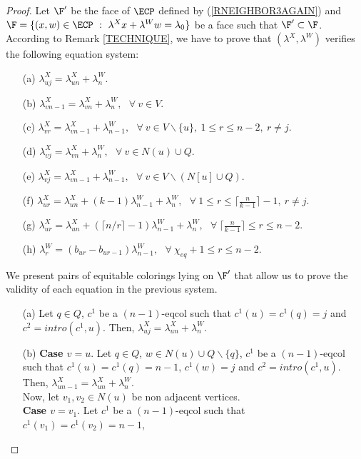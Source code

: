 \begin{proof}
Let $\F'$ be the face of $\ECP$ defined by (\ref{RNEIGHBOR3AGAIN}) and
$\F = \{ (x,w) \in \ECP ~:~ \lambda^X x + \lambda^W w = \lambda_0\}$ be a face such that $\F' \subset \F$.
According to Remark \ref{TECHNIQUE}, we have to prove that $(\lambda^X, \lambda^W)$ verifies the following equation system: 
\begin{enumerate}
\item[(a)] $\lambda^X_{uj} = \lambda^X_{un} + \lambda^W_n$.
\item[(b)] $\lambda^X_{vn-1} = \lambda^X_{vn} + \lambda^W_n,~~~ \forall~ v \in V$.
\item[(c)] $\lambda^X_{vr} = \lambda^X_{vn-1} + \lambda^W_{n-1},~~~ \forall~ v \in V \backslash \{u\},~ 1 \leq r \leq n - 2,~ r \neq j$.
\item[(d)] $\lambda^X_{vj} = \lambda^X_{vn} + \lambda^W_n,~~~ \forall~ v \in N(u) \cup Q$.
\item[(e)] $\lambda^X_{vj} = \lambda^X_{vn-1} + \lambda^W_{n-1},~~~ \forall~ v \in V \backslash (N[u] \cup Q)$.
\item[(f)] $\lambda^X_{ur} = \lambda^X_{un} + (k - 1) \lambda^W_{n-1} + \lambda^W_n,~~~ \forall~ 1 \leq r \leq \lceil \frac{n}{k-1} \rceil - 1,~ r \neq j$.
\item[(g)] $\lambda^X_{ur} = \lambda^X_{un} + (\lceil n / r \rceil - 1) \lambda^W_{n-1} + \lambda^W_n,~~~ \forall~ \lceil \frac{n}{k-1} \rceil \leq r \leq n - 2$.
\item[(h)] $\lambda^W_r = (b_{ur} - b_{ur-1}) \lambda^W_{n-1},~~~ \forall~ \chi_{eq} + 1 \leq r \leq n-2$.
\end{enumerate}
We present pairs of equitable colorings lying on $\F'$ that allow us to
prove the validity of each equation in the previous system.
\begin{enumerate}
\item[(a)] Let $q \in Q$, $c^1$ be a $(n-1)$-eqcol such that $c^1(u) = c^1(q) = j$ and $c^2 = intro(c^1,u)$.
Then, $\lambda^X_{uj} = \lambda^X_{un} + \lambda^W_n$.
\item[(b)] \textbf{Case $v = u$}. Let $q \in Q$, $w \in N(u) \cup Q \backslash \{q\}$, $c^1$ be a $(n-1)$-eqcol
such that $c^1(u) = c^1(q) = n-1$, $c^1(w) = j$ and $c^2 = intro(c^1,u)$. Then, $\lambda^X_{un-1} = \lambda^X_{un} + \lambda^W_n$.\\
Now, let $v_1, v_2 \in N(u)$ be non adjacent vertices.\\
\textbf{Case $v = v_1$}. Let $c^1$ be a $(n-1)$-eqcol such that $c^1(v_1) = c^1(v_2) = n-1$,

\end{enumerate}
\end{proof}
